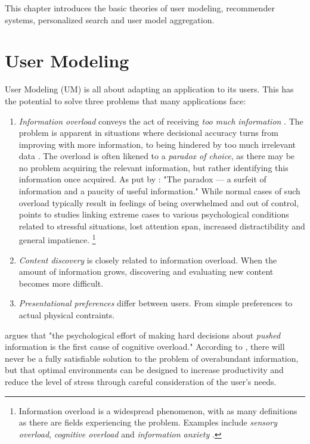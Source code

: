 This chapter introduces the basic theories of 
user modeling, recommender systems, personalized search and user model aggregation.

\section{User Modeling}

User Modeling (UM) is all about adapting an application to its users.
This has the potential to solve three problems that many applications face:

\begin{enumerate}

\item \emph{Information overload} conveys the act of receiving \emph{too much information} \cite[p13]{Bjorkoy2010d}. 
The problem is apparent in situations where decisional accuracy turns from improving with more information, to being hindered by too much irrelevant data \cite{Eppler2004}. 
The overload is often likened to a \emph{paradox of choice}, as there may be no problem acquiring the relevant information, but rather identifying this information once acquired. As put by \cite{Edmunds2000}: "The paradox --- a surfeit of information and a paucity of useful information."
While normal cases of such overload typically result in feelings of being overwhelmed and out of control, \cite{Bawden2008} points to studies linking extreme cases to various psychological conditions related to stressful situations, lost attention span, increased distractibility and general impatience.
\footnote{Information overload is a widespread phenomenon, with as many definitions as there are fields experiencing the problem. Examples include \emph{sensory overload}, \emph{cognitive overload} and \emph{information anxiety} \citep{Eppler2004}.}

\item \emph{Content discovery} is closely related to information overload. When the amount of information grows, 
discovering and evaluating new content becomes more difficult. 

\item \emph{Presentational preferences} differ between users. From simple preferences to actual physical contraints. 

\end{enumerate}

\cite{Kirsh2000} argues that "the psychological effort of making hard decisions about \emph{pushed} information is the first cause of cognitive overload." According to \citeauthor{Kirsh2000}, there will never be a fully satisfiable solution to the problem of overabundant information, but that optimal environments can be designed to increase productivity and reduce the level of stress through careful consideration of the user's needs. 

